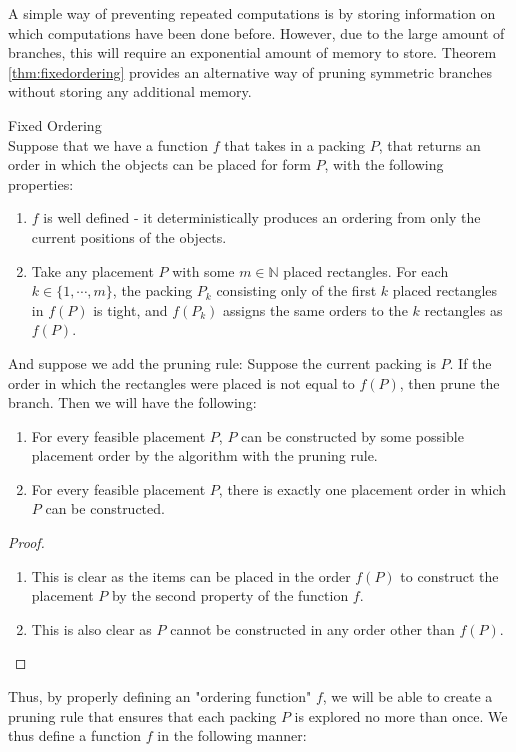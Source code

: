 \documentclass{article}
\begin{document}
\begin{defn}
\begin{defn}
\begin{dfn}
\begin{dfn}
A simple way of preventing repeated computations is by storing information on which computations have been done before. However, due to the large amount of branches, this will require an exponential amount of memory to store. Theorem \ref{thm:fixedordering} provides an alternative way of pruning symmetric branches without storing any additional memory.

\begin{thm} Fixed Ordering\\
\label{thm:fixedordering}
Suppose that we have a function $f$ that takes in a packing $P$, that returns an order in which the objects can be placed for form $P$, with the following properties:
  \begin{enumerate}
  \item $f$ is well defined - it deterministically produces an ordering from only the current positions of the objects.
  \item Take any placement $P$ with some $m \in \mathbb{N}$ placed rectangles. For each $k \in \{1,\cdots,m\}$, the packing $P_k$ consisting only of the first $k$ placed rectangles in $f(P)$ is tight, and $f(P_k)$ assigns the same orders to the $k$ rectangles as $f(P)$.
  \end{enumerate}
And suppose we add the pruning rule: Suppose the current packing is $P$. If the order in which the rectangles were placed is not equal to $f(P)$, then prune the branch.
Then we will have the following:
  \begin{enumerate}
  \item For every feasible placement $P$, $P$ can be constructed by some possible placement order by the algorithm with the pruning rule.
  \item For every feasible placement $P$, there is exactly one placement order in which $P$ can be constructed.
  \end{enumerate}
\end{thm}
\begin{proof}
\begin{enumerate}
\item
This is clear as the items can be placed in the order $f(P)$ to construct the placement $P$ by the second property of the function $f$.
\item
This is also clear as $P$ cannot be constructed in any order other than $f(P)$.
\end{enumerate}
\end{proof}

Thus, by properly defining an "ordering function" $f$, we will be able to create a pruning rule that ensures that each packing $P$ is explored no more than once. We thus define a function $f$ in the following manner:\\


\end{dfn}
\end{dfn}
\end{defn}
\end{defn}
\end{document}
